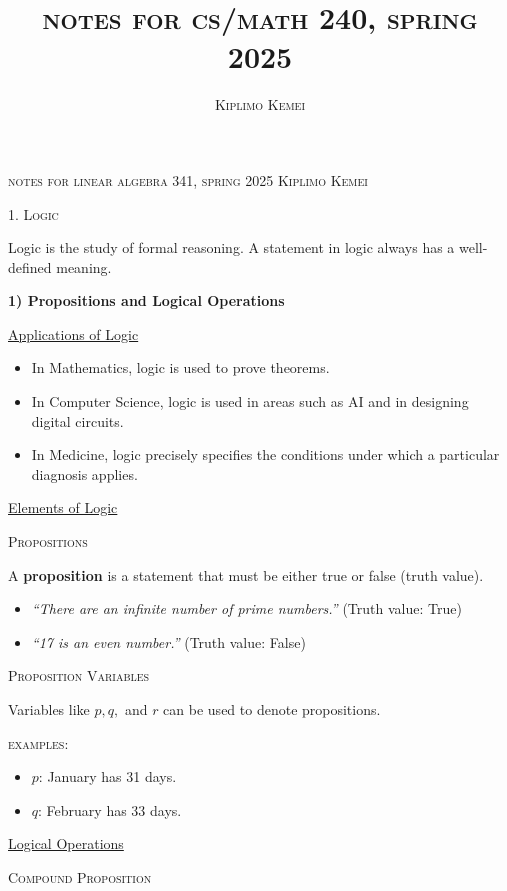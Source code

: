 \documentclass{article}
\title{\textsc{notes for cs/math 240, spring 2025}}
\author{\textsc{Kiplimo Kemei}}
\begin{document}
\begin{center}
\textsc{notes for linear algebra 341, spring 2025}
\break
\textsc{Kiplimo Kemei}
\end{center}
\medskip

\begin{center}
    \textsc{{1. Logic}}
\end{center}

Logic is the study of formal reasoning. A statement in logic always has a well-defined meaning.

\medskip
\noindent \textbf{1) Propositions and Logical Operations}

\medskip
\underline{Applications of Logic}
\begin{itemize}
    \item In Mathematics, logic is used to prove theorems.
    \item In Computer Science, logic is used in areas such as AI and in designing digital circuits.
    \item In Medicine, logic precisely specifies the conditions under which a particular diagnosis applies.
\end{itemize}

\underline{Elements of Logic}

\medskip
\textsc{Propositions}

\medskip
A \textbf{proposition} is a statement that must be either true or false (truth value). \\

\begin{itemize}
    \item \textit{``There are an infinite number of prime numbers.''} \quad (Truth value: True)
    \item \textit{``17 is an even number.''} \quad (Truth value: False)
\end{itemize}

\textsc{Proposition Variables}

\medskip
Variables like $p, q,$ and $r$ can be used to denote propositions. 

\medskip
\textsc{examples:}
\begin{itemize}
    \item $p$: January has 31 days.
    \item $q$: February has 33 days.
\end{itemize}

\underline{Logical Operations}

\medskip
\textsc{Compound Proposition} 
\end{document}
